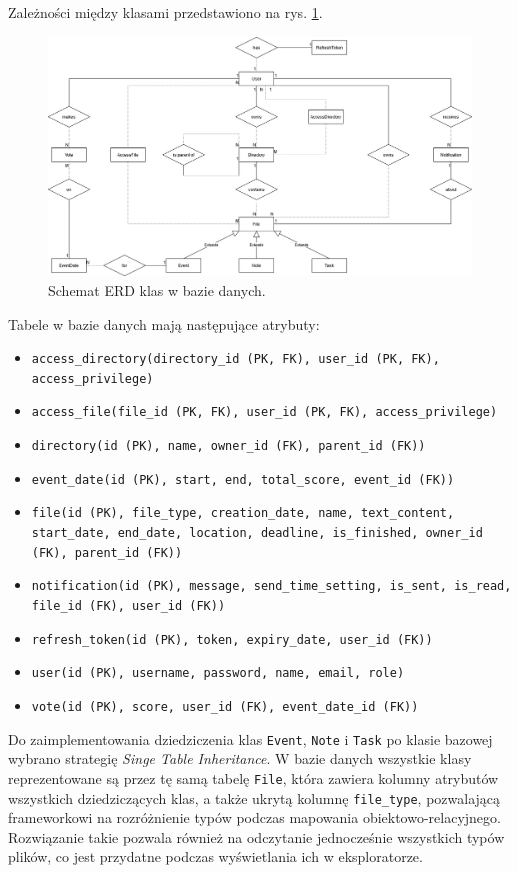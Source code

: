 \documentclass[a4paper,twoside,12pt]{book}
\newcommand{\obcy}[1]{\emph{#1}}
\newcommand{\english}[1]{{\selectlanguage{british}\obcy{#1}}}
\begin{document}
Zależności między klasami przedstawiono na rys. \ref{fig:erd}.

\begin{figure}
\centering
\includegraphics[width=\textwidth]{./ERD.png}
\caption{Schemat ERD klas w bazie danych.}
\label{fig:erd}
\end{figure}

Tabele w bazie danych mają następujące atrybuty:
\begin{itemize}
	\item \texttt{access_directory(directory_id (PK, FK), user_id (PK, FK), access_privilege)} 
	\item \texttt{access_file(file_id (PK, FK), user_id (PK, FK), access_privilege)} 
	\item \texttt{directory(id (PK), name, owner_id (FK), parent_id (FK))} 
	\item \texttt{event_date(id (PK), start, end, total_score, event_id (FK))} 
	\item \texttt{file(id (PK), file_type, creation_date, name, text_content, start_date, end_date, location, deadline, is_finished, owner_id (FK), parent_id (FK))}
	\item \texttt{notification(id (PK), message, send_time_setting, is_sent, is_read, file_id (FK), user_id (FK))}
	\item \texttt{refresh_token(id (PK), token, expiry_date, user_id (FK))}
	\item \texttt{user(id (PK), username, password, name, email, role)}
	\item \texttt{vote(id (PK), score, user_id (FK), event_date_id (FK))}
\end{itemize}

Do zaimplementowania dziedziczenia klas \texttt{Event}, \texttt{Note} i \texttt{Task} po klasie bazowej wybrano strategię \english{Singe Table Inheritance}. W bazie danych wszystkie klasy reprezentowane są przez tę samą tabelę \texttt{File}, która zawiera kolumny atrybutów wszystkich dziedziczących klas, a także ukrytą kolumnę \texttt{file_type}, pozwalającą frameworkowi na rozróżnienie typów podczas mapowania obiektowo-relacyjnego. Rozwiązanie takie pozwala również na odczytanie jednocześnie wszystkich typów plików, co jest przydatne podczas wyświetlania ich w eksploratorze.
\end{document}
